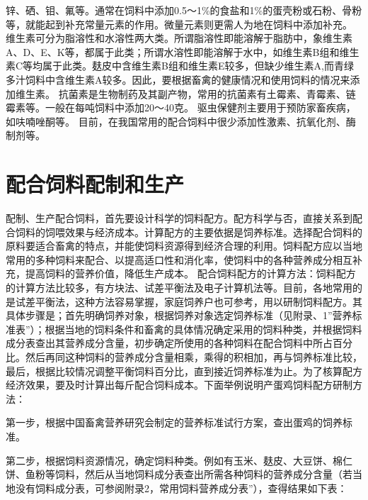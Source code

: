\documentclass{ctexbook}
\begin{document}
锌、硒、钼、氟等。通常在饲料中添加0.5〜1\%的食盐和1\%的蛋壳粉或石粉、骨粉等，就能起到补充常量元素的作用。微量元素则更需人为地在饲料中添加补充。
维生素可分为脂溶性和水溶性两大类。所谓脂溶性即能溶解于脂肪中，象维生素A、D、E、K等，都属于此类；所谓水溶性即能溶解于水中，如维生素B组和维生素C等均属于此类。麸皮中含维生素B组和维生素E较多，但缺少维生素A,而青绿多汁饲料中含维生素A较多。因此，要根据畜禽的健康情况和使用饲料的情况来添加维生素。
抗菌素是生物制药及其副产物，常用的抗菌素有土霉素、青霉素、链霉素等。一般在每吨饲料中添加20〜40克。
驱虫保健剂主要用于预防家畜疾病，如呋喃唑酮等。
目前，在我国常用的配合饲料中很少添加性激素、抗氧化剂、酶制剂等。
\section{配合饲料配制和生产}
配制、生产配合饲料，首先要设计科学的饲料配方。配方科学与否，直接关系到配合饲料的饲喂效果与经济成本。计算配方的主要依据是饲养标准。选择配合饲料的原料要适合畜禽的特点，并能使饲料资源得到经济合理的利用。饲料配方应以当地常用的多种饲料来配合、以提高适口性和消化率，使饲料中的各种营养成分相互补充，提高饲料的营养价值，降低生产成本。
配合饲料配方的计算方法：饲料配方的计算方法比较多，有方块法、试差平衡法及电子计算机法等。目前，各地常用的是试差平衡法，这种方法容易掌握，家庭饲养户也可参考，用以研制饲料配方。其具体步骤是；首先明确饲养对象，根据饲养对象选定饲养标准（见附录、1”营养标准表”）；根据当地的饲料条件和畜禽的具体情况确定采用的饲料种类，并根据饲料成分表查出其营养成分含量，初步确定所使用的各种饲料在配合饲料中所占百分比。然后再同这种饲料的营养成分含量相乘，乘得的积相加，再与饲养标准比较，最后，根据比较情况调整平衡饲料百分比，直到接近饲养标准为止。为了核算配方经济效果，要及时计算出每斤配合饲料成本。下面举例说明产蛋鸡饲料配方研制方法：

第一步，根据中国畜禽营养研究会制定的营养标准试行方案，查出蛋鸡的饲养标准。

第二步，根据饲料资源情况，确定饲料种类。例如有玉米、麸皮、大豆饼、棉仁饼、鱼粉等饲料，然后从当地饲料成分表查出所需各种饲料的营养成分含量（若当地没有饲料成分表，可参阅附录2，常用饲料营养成分表”），查得结果如下表：
\end{document}
